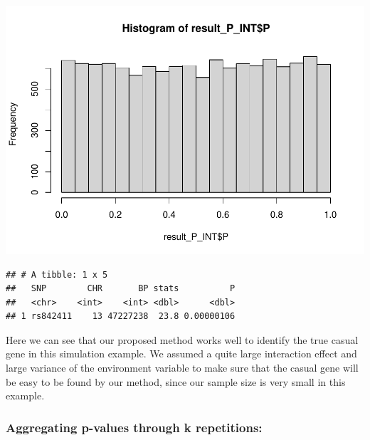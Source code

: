\documentclass[
]{article}
\newenvironment{Shaded}{\begin{snugshade}}{\end{snugshade}}
\newcommand{\DataTypeTok}[1]{\textcolor[rgb]{0.13,0.29,0.53}{#1}}
\newcommand{\DecValTok}[1]{\textcolor[rgb]{0.00,0.00,0.81}{#1}}
\newcommand{\KeywordTok}[1]{\textcolor[rgb]{0.13,0.29,0.53}{\textbf{#1}}}
\newcommand{\NormalTok}[1]{#1}
\newcommand{\OperatorTok}[1]{\textcolor[rgb]{0.81,0.36,0.00}{\textbf{#1}}}
\newcommand{\StringTok}[1]{\textcolor[rgb]{0.31,0.60,0.02}{#1}}
\begin{document}
\begin{Shaded}
\end{Shaded}

\includegraphics{stats-gene-research-progress-v7_files/figure-latex/OneCasualGene-3.pdf}

\begin{Shaded}
\end{Shaded}

\begin{verbatim}
## # A tibble: 1 x 5
##   SNP        CHR       BP stats          P
##   <chr>    <int>    <int> <dbl>      <dbl>
## 1 rs842411    13 47227238  23.8 0.00000106
\end{verbatim}

Here we can see that our proposed method works well to identify the true
casual gene in this simulation example. We assumed a quite large
interaction effect and large variance of the environment variable to
make sure that the casual gene will be easy to be found by our method,
since our sample size is very small in this example.

\clearpage

\hypertarget{aggregating-p-values-through-k-repetitions}{%
\subsubsection{Aggregating p-values through k
repetitions:}\label{aggregating-p-values-through-k-repetitions}}
\end{document}

